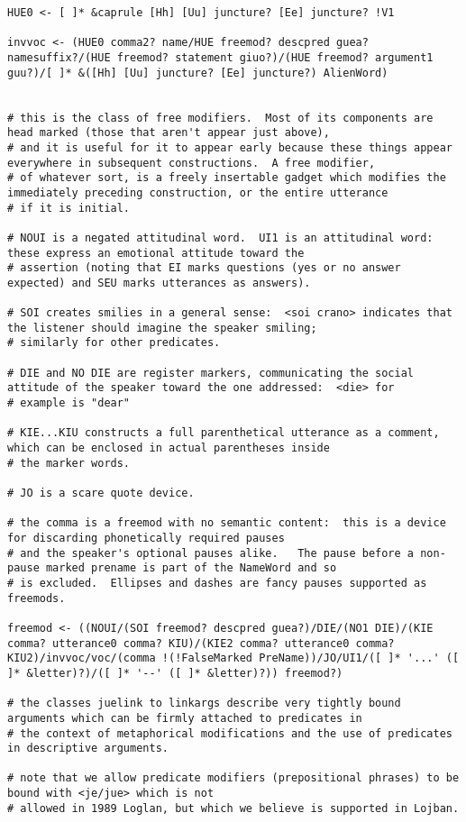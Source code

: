 \documentclass[12pt]{book}
\begin{document}
{\begin{verbatim}
HUE0 <- [ ]* &caprule [Hh] [Uu] juncture? [Ee] juncture? !V1

invvoc <- (HUE0 comma2? name/HUE freemod? descpred guea? namesuffix?/(HUE freemod? statement giuo?)/(HUE freemod? argument1 guu?)/[ ]* &([Hh] [Uu] juncture? [Ee] juncture?) AlienWord)


# this is the class of free modifiers.  Most of its components are head marked (those that aren't appear just above),
# and it is useful for it to appear early because these things appear everywhere in subsequent constructions.  A free modifier,
# of whatever sort, is a freely insertable gadget which modifies the immediately preceding construction, or the entire utterance
# if it is initial.

# NOUI is a negated attitudinal word.  UI1 is an attitudinal word:  these express an emotional attitude toward the 
# assertion (noting that EI marks questions (yes or no answer expected) and SEU marks utterances as answers).

# SOI creates smilies in a general sense:  <soi crano> indicates that the listener should imagine the speaker smiling;
# similarly for other predicates.

# DIE and NO DIE are register markers, communicating the social attitude of the speaker toward the one addressed:  <die> for
# example is "dear"

# KIE...KIU constructs a full parenthetical utterance as a comment, which can be enclosed in actual parentheses inside
# the marker words.

# JO is a scare quote device.

# the comma is a freemod with no semantic content:  this is a device for discarding phonetically required pauses
# and the speaker's optional pauses alike.   The pause before a non-pause marked prename is part of the NameWord and so
# is excluded.  Ellipses and dashes are fancy pauses supported as freemods.

freemod <- ((NOUI/(SOI freemod? descpred guea?)/DIE/(NO1 DIE)/(KIE comma? utterance0 comma? KIU)/(KIE2 comma? utterance0 comma? KIU2)/invvoc/voc/(comma !(!FalseMarked PreName))/JO/UI1/([ ]* '...' ([ ]* &letter)?)/([ ]* '--' ([ ]* &letter)?)) freemod?)

# the classes juelink to linkargs describe very tightly bound arguments which can be firmly attached to predicates in 
# the context of metaphorical modifications and the use of predicates in descriptive arguments.

# note that we allow predicate modifiers (prepositional phrases) to be bound with <je/jue> which is not
# allowed in 1989 Loglan, but which we believe is supported in Lojban.


\end{verbatim}}
\end{document}
